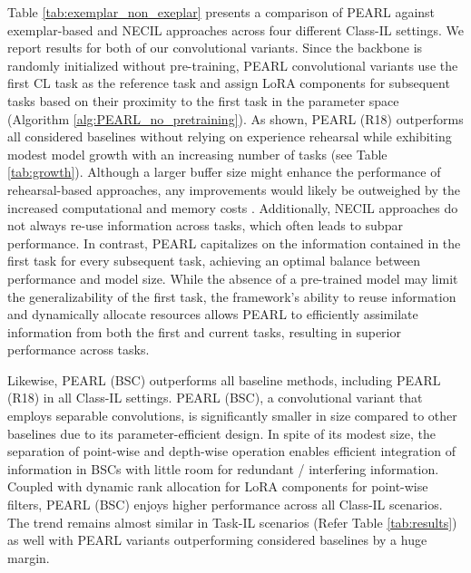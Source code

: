 \documentclass[10pt]{article} %
\begin{document}
Table \ref{tab:exemplar_non_exeplar} presents a comparison of PEARL against exemplar-based and NECIL approaches across four different Class-IL settings. We report results for both of our convolutional variants. Since the backbone is randomly initialized without pre-training, PEARL convolutional variants use the first CL task as the reference task and assign LoRA components for subsequent tasks based on their proximity to the first task in the parameter space (Algorithm \ref{alg:PEARL_no_pretraining}). As shown, PEARL (R18) outperforms all considered baselines without relying on experience rehearsal while exhibiting modest model growth with an increasing number of tasks (see Table \ref{tab:growth}). Although a larger buffer size might enhance the performance of rehearsal-based approaches, any improvements would likely be outweighed by the increased computational and memory costs \citep{TriRE2023}. Additionally, NECIL approaches do not always re-use information across tasks, which often leads to subpar performance. In contrast, PEARL capitalizes on the information contained in the first task for every subsequent task, achieving an optimal balance between performance and model size. While the absence of a pre-trained model may limit the generalizability of the first task, the framework's ability to reuse information and dynamically allocate resources allows PEARL to efficiently assimilate information from both the first and current tasks, resulting in superior performance across tasks. 


Likewise, PEARL (BSC) outperforms all baseline methods, including PEARL (R18) in all Class-IL settings. PEARL (BSC), a convolutional variant that employs separable convolutions, is significantly smaller in size compared to other baselines due to its parameter-efficient design. In spite of its modest size, the separation of point-wise and depth-wise operation enables efficient integration of information in BSCs with little room for redundant  / interfering information. Coupled with dynamic rank allocation for LoRA components for point-wise filters, PEARL (BSC) enjoys higher performance across all Class-IL scenarios. The trend remains almost similar in Task-IL scenarios (Refer Table \ref{tab:results}) as well with PEARL variants outperforming considered baselines by a huge margin. 
\end{document}
